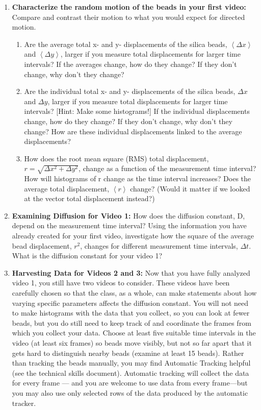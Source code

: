 \begin{enumerate}
\item \textbf{Characterize the random motion of the beads in your first video:} Compare and contrast their motion to what you would expect for directed motion.
\begin{enumerate}
\item Are the average total x- and y- displacements of the silica beads, $\left\langle \Delta x \right\rangle $ and $\left\langle \Delta y \right\rangle $, larger if
you measure total displacements for larger time intervals? If the averages change, how do
they change? If they don't change, why don't they change?
\item Are the individual total x- and y- displacements of the silica beads, $\Delta x$ and $\Delta y$, larger if you
measure total displacements for larger time intervals? [Hint: Make some histograms!] If the individual displacements change, how do they change? If they don't change, why don't they change? How are these individual displacements linked to the average displacements?
\item How does the root mean square (RMS) total displacement, $r = \sqrt{\Delta x^{2}+\Delta y^{2}}$, change as a function of the measurement time interval? How will histograms of r change as the time interval increases? Does the average total displacement, $\left\langle  r \right\rangle $ change? (Would it matter if we looked at the vector total displacement instead?)
\end{enumerate}
\item \textbf{Examining Diffusion for Video 1:} How does the diffusion constant, D, depend on the measurement time interval? Using the information you have already created for your first video, investigate how the square of the average bead displacement, $r^{2}$, changes for different measurement time intervals, $\Delta t$. What is the diffusion constant for your video 1?
\item \textbf{Harvesting Data for Videos 2 and 3:} Now that you have fully analyzed video 1, you still have two videos to consider. These videos have been carefully chosen so that the class, as a whole, can make statements about how varying specific parameters affects the diffusion constant. You will not need to make histograms with the data that you collect, so you can look at fewer beads, but you do still need to keep track of and coordinate the frames from which you collect your data. Choose at least five suitable time intervals in the video (at least six frames) so beads move visibly, but not so far apart that it gets hard to distinguish nearby beads (examine at least 15 beads). Rather than tracking the beads manually, you may find Automatic Tracking helpful (see the technical skills document). Automatic tracking will collect the data for every frame — and you are welcome to use data from every frame—but you may also use only selected rows of the data produced by the automatic tracker.

\end{enumerate}
